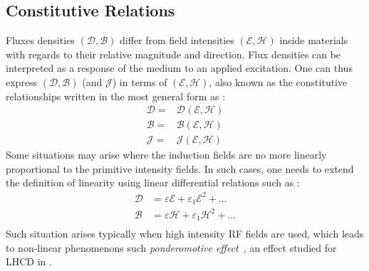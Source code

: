 \subsection{Constitutive Relations}
Fluxes densities $(\boldsymbol{\mathcal{D}}, \boldsymbol{\mathcal{B}})$ differ from field intensities $(\boldsymbol{\mathcal{E}}, \boldsymbol{\mathcal{H}})$ inside materials with regards to their relative magnitude and direction. Flux densities can be interpreted  as a response of the medium to an applied excitation. One can thus express $(\boldsymbol{\mathcal{D}},\boldsymbol{\mathcal{B}})$ (and $\boldsymbol{\mathcal{J}}$) in terms of $(\boldsymbol{\mathcal{E}},\boldsymbol{\mathcal{H}})$, also known as the constitutive relationships written in the most general form as :
\begin{subequations}
	\begin{align}
		\boldsymbol{\mathcal{D}} =& \boldsymbol{\mathcal{D}}(\boldsymbol{\mathcal{E}},\boldsymbol{\mathcal{H}}) \\
		\boldsymbol{\mathcal{B}} =& \boldsymbol{\mathcal{B}}(\boldsymbol{\mathcal{E}},\boldsymbol{\mathcal{H}}) \\
		\boldsymbol{\mathcal{J}} =& \boldsymbol{\mathcal{J}}(\boldsymbol{\mathcal{E}},\boldsymbol{\mathcal{H}})
	\end{align}
\end{subequations}
Some situations may arise where the induction fields are no more linearly proportional to the primitive intensity fields. In such cases, one needs to extend the definition of linearity using linear differential relations such as :
\begin{subequations}
	\begin{align}
		\boldsymbol{\mathcal{D}} &= \varepsilon \boldsymbol{\mathcal{E}} + \varepsilon_1 \boldsymbol{\mathcal{E}}^2  + \ldots \\
		\boldsymbol{\mathcal{B}} &= \varepsilon \boldsymbol{\mathcal{H}} + \varepsilon_1 \boldsymbol{\mathcal{H}}^2 + \ldots \\
	\end{align}
\end{subequations}%
Such situation arises typically when high intensity RF fields are used, which leads to non-linear phenomenons such \emph{ponderomotive effect}~, an effect studied for LHCD in .



